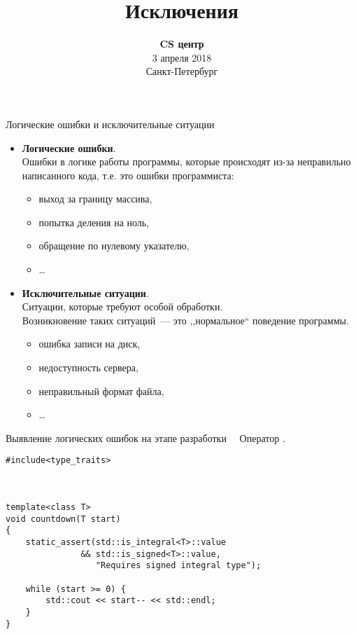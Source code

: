 \documentclass{beamer}
\title{Исключения}
\date{
   \textbf{CS центр}\\
   3 апреля 2018 \\
   Санкт-Петербург
}
\begin{document}
\begin{frame} 
  \titlepage
\end{frame}
\newcommand{\fakeitem}{{\color{MOOCBlue}\textbullet}\ \ }

\begin{frame}[fragile]{Логические ошибки и исключительные ситуации}
\begin{itemize}
\item \textbf{Логические ошибки}.\\
Ошибки в логике работы программы, которые происходят 
из-за неправильно написанного кода, т.е. это ошибки программиста:
\begin{itemize} 
    \item выход за границу массива,
    \item попытка деления на ноль,
    \item обращение по нулевому указателю,
    \item \ldots
\end{itemize}
\pause
\item \textbf{Исключительные ситуации}.\\
Ситуации, которые требуют особой обработки.\\
Возникновение таких ситуаций~— это ,,нормальное``  поведение программы.
\begin{itemize} 
    \item ошибка записи на диск,
    \item недоступность сервера,
    \item неправильный формат файла,
    \item \ldots
\end{itemize}
\end{itemize}
\end{frame}

\begin{frame}[fragile]{Выявление логических ошибок на этапе разработки}
    \fakeitem Оператор .\\
    \mbox{}
    \begin{lstlisting}
#include<type_traits>



template<class T> 
void countdown(T start) 
{
    static_assert(std::is_integral<T>::value
               && std::is_signed<T>::value, 
                  "Requires signed integral type");
                  
    while (start >= 0) {
        std::cout << start-- << std::endl;
    }
}
    \end{lstlisting}
\end{frame}
\end{document}
